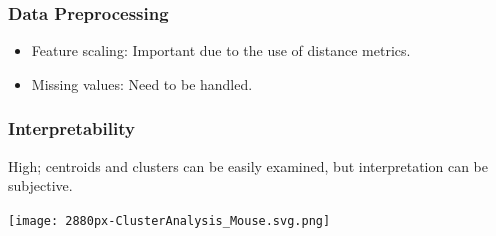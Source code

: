 \documentclass[english, threecolumn]{latex4ei/latex4ei_sheet}
\begin{document}
\begin{sectionbox}
\subsubsection{Data Preprocessing}
\begin{itemize}
    \item Feature scaling: Important due to the use of distance metrics.
    \item Missing values: Need to be handled.
\end{itemize}

\subsubsection{Interpretability}
High; centroids and clusters can be easily examined, but interpretation can be subjective.

\texttt{[image: 2880px-ClusterAnalysis\_Mouse.svg.png]}
\end{sectionbox}
\end{document}
